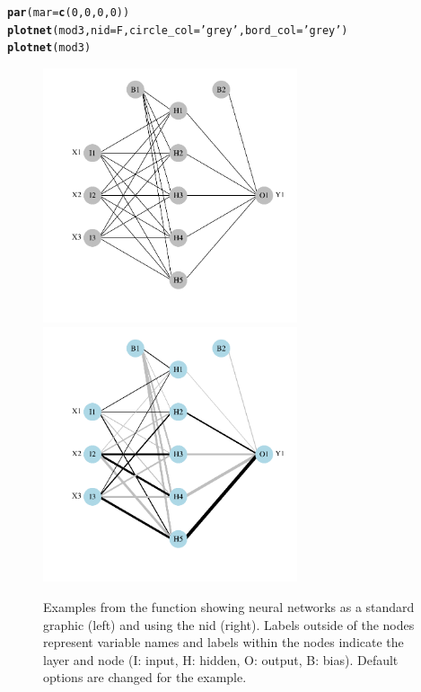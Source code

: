 \documentclass[article,shortnames]{jss}\usepackage[]{graphicx}\usepackage[]{color}
\makeatletter
\newcommand{\hlnum}[1]{\textcolor[rgb]{0.686,0.059,0.569}{#1}}%
\newcommand{\hlstr}[1]{\textcolor[rgb]{0.192,0.494,0.8}{#1}}%
\newcommand{\hlstd}[1]{\textcolor[rgb]{0.345,0.345,0.345}{#1}}%
\newcommand{\hlkwc}[1]{\textcolor[rgb]{0.333,0.667,0.333}{#1}}%
\newcommand{\hlkwd}[1]{\textcolor[rgb]{0.737,0.353,0.396}{\textbf{#1}}}%
\newenvironment{kframe}{%
 \def\at@end@of@kframe{}%
 \ifinner\ifhmode%
  \def\at@end@of@kframe{\end{minipage}}%
  \begin{minipage}{\columnwidth}%
 \fi\fi%
 \def\FrameCommand##1{\hskip\@totalleftmargin \hskip-\fboxsep
 \colorbox{shadecolor}{##1}\hskip-\fboxsep
     \hskip-\linewidth \hskip-\@totalleftmargin \hskip\columnwidth}%
 \MakeFramed {\advance\hsize-\width
   \@totalleftmargin\z@ \linewidth\hsize
   \@setminipage}}%
 {\par\unskip\endMakeFramed%
 \at@end@of@kframe}
\makeatother
\begin{document}
\begin{kframe}
\begin{alltt}
\hlkwd{par}\hlstd{(}\hlkwc{mar} \hlstd{=} \hlkwd{c}\hlstd{(}\hlnum{0}\hlstd{,} \hlnum{0}\hlstd{,} \hlnum{0}\hlstd{,} \hlnum{0}\hlstd{))}
\hlkwd{plotnet}\hlstd{(mod3,} \hlkwc{nid} \hlstd{= F,} \hlkwc{circle_col} \hlstd{=} \hlstr{'grey'}\hlstd{,} \hlkwc{bord_col} \hlstd{=} \hlstr{'grey'}\hlstd{)}
\hlkwd{plotnet}\hlstd{(mod3)}
\end{alltt}
\end{kframe}\begin{figure}[!ht]

{\centering \includegraphics[width=7.5cm,height=7.5cm]{figs/plotnet-1} 
\includegraphics[width=7.5cm,height=7.5cm]{figs/plotnet-2} 

}

\caption[Examples from the  function showing neural networks as a standard graphic (left) and using the \acl{nid} (right)]{Examples from the  function showing neural networks as a standard graphic (left) and using the \acl{nid} (right).  Labels outside of the nodes represent variable names and labels within the nodes indicate the layer and node (I: input, H: hidden, O: output, B: bias).  Default options are changed for the example.}\label{fig:plotnet}
\end{figure}
\end{document}
